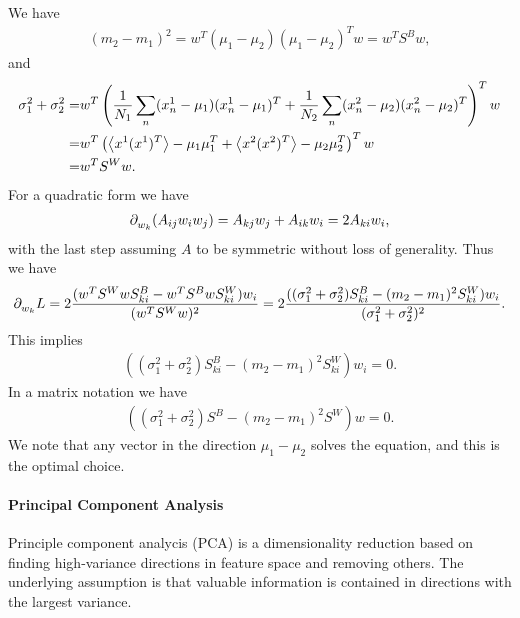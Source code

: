 We have
\begin{align*}
	(m_{2} - m_{1})^{2} = w^{T}\left(\mu_{1} - \mu_{2}\right)\left(\mu_{1} - \mu_{2}\right)^{T}w = w^{T}S^{B}w,
\end{align*}
and
\begin{align*}
	\sigma_{1}^{2} + \sigma_{2}^{2} =& w^{T}\left(\frac{1}{N_{1}}\sum\limits_{n}(x_{n}^{1} - \mu_{1})(x_{n}^{1} - \mu_{1})^{T} + \frac{1}{N_{2}}\sum\limits_{n}(x_{n}^{2} - \mu_{2})(x_{n}^{2} - \mu_{2})^{T}\right)^{T}w \\
	                                =& w^{T}\left(\expval{x^{1}(x^{1})^{T}} - \mu_{1}\mu_{1}^{T} + \expval{x^{2}(x^{2})^{T}} - \mu_{2}\mu_{2}^{T}\right)^{T}w \\
	                                =& w^{T}S^{W}w.
\end{align*}
For a quadratic form we have
\begin{align*}
	\partial^{}_{w_{k}}(A_{ij}w_{i}w_{j}) = A_{kj}w_{j} + A_{ik}w_{i} = 2A_{ki}w_{i},
\end{align*}
with the last step assuming $A$ to be symmetric without loss of generality. Thus we have
\begin{align*}
	\partial^{}_{w_{k}}L = 2\frac{(w^{T}S^{W}wS^{B}_{ki} - w^{T}S^{B}wS^{W}_{ki})w_{i}}{(w^{T}S^{W}w)^{2}} = 2\frac{((\sigma_{1}^{2} + \sigma_{2}^{2})S^{B}_{ki} - (m_{2} - m_{1})^{2}S^{W}_{ki})w_{i}}{(\sigma_{1}^{2} + \sigma_{2}^{2})^{2}}.
\end{align*}
This implies
\begin{align*}
	((\sigma_{1}^{2} + \sigma_{2}^{2})S^{B}_{ki} - (m_{2} - m_{1})^{2}S^{W}_{ki})w_{i} = 0.
\end{align*}
In a matrix notation we have
\begin{align*}
	((\sigma_{1}^{2} + \sigma_{2}^{2})S^{B} - (m_{2} - m_{1})^{2}S^{W})w = 0.
\end{align*}
We note that any vector in the direction $\mu_{1} - \mu_{2}$ solves the equation, and this is the optimal choice.

\paragraph{Principal Component Analysis}
Principle component analycis (PCA) is a dimensionality reduction based on finding high-variance directions in feature space and removing others. The underlying assumption is that valuable information is contained in directions with the largest variance.

